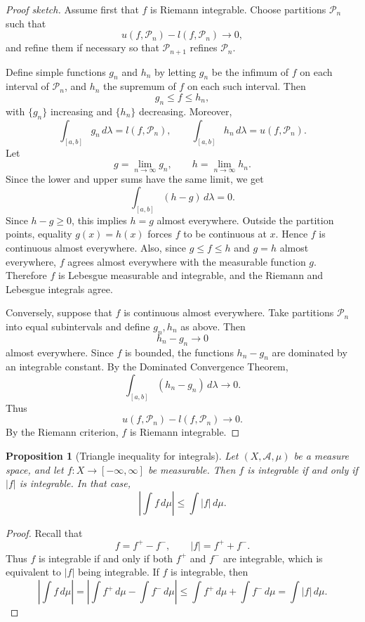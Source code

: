 \documentclass[12pt]{article}
\newtheorem{proposition}{Proposition}
\begin{document}
\begin{proof}[Proof sketch]
Assume first that $f$ is Riemann integrable. Choose partitions
$\mathcal{P}_n$ such that
\[
u(f,\mathcal{P}_n)-l(f,\mathcal{P}_n)\to 0,
\]
and refine them if necessary so that $\mathcal{P}_{n+1}$ refines
$\mathcal{P}_n$.

Define simple functions $g_n$ and $h_n$ by letting $g_n$ be the infimum of $f$
on each interval of $\mathcal{P}_n$, and $h_n$ the supremum of $f$ on each such
interval. Then
\[
g_n \le f \le h_n,
\]
with $\{g_n\}$ increasing and $\{h_n\}$ decreasing. Moreover,
\[
\int_{[a,b]} g_n\,d\lambda = l(f,\mathcal{P}_n),
\qquad
\int_{[a,b]} h_n\,d\lambda = u(f,\mathcal{P}_n).
\]
Let
\[
g=\lim_{n\to\infty} g_n,
\qquad
h=\lim_{n\to\infty} h_n.
\]
Since the lower and upper sums have the same limit, we get
\[
\int_{[a,b]} (h-g)\,d\lambda = 0.
\]
Since $h-g\ge 0$, this implies $h=g$ almost everywhere. Outside the partition
points, equality $g(x)=h(x)$ forces $f$ to be continuous at $x$. Hence $f$ is
continuous almost everywhere. Also, since $g\le f\le h$ and $g=h$ almost
everywhere, $f$ agrees almost everywhere with the measurable function $g$.
Therefore $f$ is Lebesgue measurable and integrable, and the Riemann and
Lebesgue integrals agree.

Conversely, suppose that $f$ is continuous almost everywhere. Take partitions
$\mathcal{P}_n$ into equal subintervals and define $g_n,h_n$ as above. Then
\[
h_n-g_n \to 0
\]
almost everywhere. Since $f$ is bounded, the functions $h_n-g_n$ are dominated
by an integrable constant. By the Dominated Convergence Theorem,
\[
\int_{[a,b]} (h_n-g_n)\,d\lambda \to 0.
\]
Thus
\[
u(f,\mathcal{P}_n)-l(f,\mathcal{P}_n)\to 0.
\]
By the Riemann criterion, $f$ is Riemann integrable.
\end{proof}

\begin{proposition}[Triangle inequality for integrals]
Let $(X,\mathcal{A},\mu)$ be a measure space, and let
$f:X\to[-\infty,\infty]$ be measurable. Then $f$ is integrable if and only if
$|f|$ is integrable. In that case,
\[
\left|\int f\,d\mu\right|
\le
\int |f|\,d\mu.
\]
\end{proposition}

\begin{proof}
Recall that
\[
f=f^+-f^-,
\qquad
|f|=f^++f^-.
\]
Thus $f$ is integrable if and only if both $f^+$ and $f^-$ are integrable, which
is equivalent to $|f|$ being integrable. If $f$ is integrable, then
\[
\left|\int f\,d\mu\right|
=
\left|\int f^+\,d\mu-\int f^-\,d\mu\right|
\le
\int f^+\,d\mu+\int f^-\,d\mu
=
\int |f|\,d\mu.
\]
\end{proof}
\end{document}
